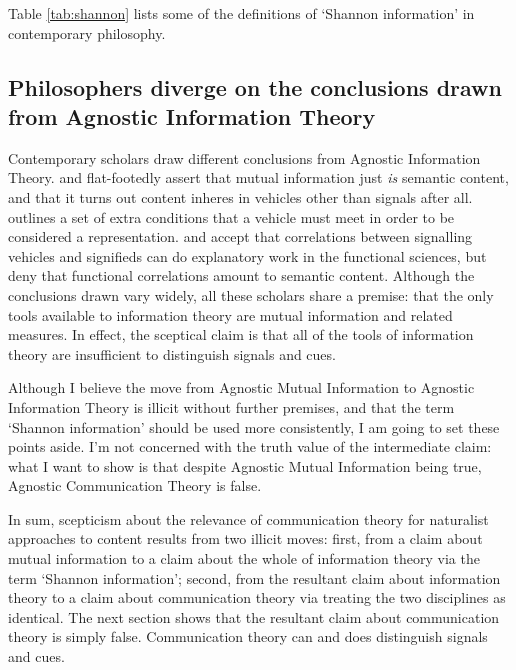 Table \ref{tab:shannon} lists some of the definitions of `Shannon information' in contemporary philosophy.



\subsection{\sloppy Philosophers diverge on the conclusions drawn from {\sc Agnostic Information Theory}}

Contemporary scholars draw different conclusions from {\sc Agnostic Information Theory}.
\citet{skyrms2010signals} and \citet{isaac2018semantics} flat-footedly assert that mutual information just \textit{is} semantic content, and that it turns out content inheres in vehicles other than signals after all.
\citet[SECTION]{shea2018representation} outlines a set of extra conditions that a vehicle must meet in order to be considered a representation. 
\citet{lean2014shannon} and \citet[CHAPTER]{hutto2017evolving} accept that correlations between signalling vehicles and signifieds can do explanatory work in the functional sciences, but deny that functional correlations amount to semantic content.
Although the conclusions drawn vary widely, all these scholars share a premise: that the only tools available to information theory are mutual information and related measures.
In effect, the sceptical claim is that all of the tools of information theory are insufficient to distinguish signals and cues.

Although I believe the move from {\sc Agnostic Mutual Information} to {\sc Agnostic Information Theory} is illicit without further premises, and that the term `Shannon information' should be used more consistently, I am going to set these points aside.
I'm not concerned with the truth value of the intermediate claim: what I want to show is that despite {\sc Agnostic Mutual Information} being true, {\sc Agnostic Communication Theory} is false.

In sum, scepticism about the relevance of communication theory for naturalist approaches to content results from two illicit moves: first, from a claim about mutual information to a claim about the whole of information theory via the term `Shannon information'; second, from the resultant claim about information theory to a claim about communication theory via treating the two disciplines as identical.
The next section shows that the resultant claim about communication theory is simply false.
Communication theory can and does distinguish signals and cues.



